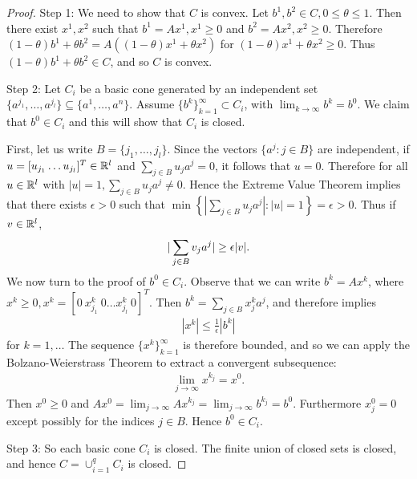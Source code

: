 \begin{proof}
Step 1:
We need to show that $C$ is convex.
Let $b^1, b^2 \in C, 0 \le \theta \le 1$.
Then there exist $x^1, x^2$ such that $b^1 = A x^1, x^1 \ge 0$ and $b^2 = A x^2, x^2 \ge 0$.
Therefore $(1-\theta)b^1 + \theta b^2 = A \left( (1-\theta) x^1 + \theta x^2 \right)$ for $(1-\theta) x^1 + \theta x^2 \ge 0$.
Thus $(1-\theta)b^1 + \theta b^2 \in C$, and so $C$ is convex.

Step 2:
Let $C_i$ be a basic cone generated by an independent set$\{ a^{j_1}, \dots, a^{j_l} \} \subseteq \{ a^1, \dots, a^n \}$.
Assume $\{ b^k \}_{k=1}^{\infty} \subset C_i$, with $\lim _{k \to \infty} b^k = b^0$.
We claim that $b^0 \in C_i$ and this will show that $C_i$ is closed.

First, let us write $B = \{ j_1, \dots, j_l \}$.
Since the vectors $\{ a^j : j \in B \}$ are independent, if $u = [u_{j_1} \dots u_{j_l}]^T \in \mathbb{R}^l$ and $\sum _{j \in B} u_j a^j = 0$, it follows that $u = 0$.
Therefore for all $u \in \mathbb{R}^l$ with $|u| = 1, \sum _{j \in B} u_j a^j \neq 0$.
Hence the Extreme Value Theorem implies that there exists $\epsilon > 0$ such that $\min \left\{ |\sum _{j \in B} u_j a^j| : |u| = 1 \right\} = \epsilon > 0$.
Thus if $v \in \mathbb{R}^l$, 
\begin{align}
|\sum _{j \in B} v_j a^j| \ge \epsilon |v|. \labeq{proof_convex_closed_eq_1}
\end{align}
We now turn to the proof of $b^0 \in C_i$.
Observe that we can write $b^k = A x^k$, where $x^k \ge 0, x^k = [0 \ x_{j_1}^k \ 0 \dots x_{j_l}^k \ 0]^T$.
Then $b^k = \sum _{j \in B} x_j^k a^j$, and therefore  implies 
\begin{align}
|x^k| \le \frac{1}{\epsilon} |b^k|
\end{align}
for $k=1, \dots$
The sequence $\{ x^k \}_{k=1}^{\infty}$ is therefore bounded, and so we can apply the Bolzano-Weierstrass Theorem to extract a convergent subsequence:
\begin{align}
\lim _{j \to \infty} x^{k_j} = x^0.
\end{align}
Then $x^0 \ge 0$ and $A x^0 = \lim _{j \to \infty} A x^{k_j} = \lim _{j \to \infty} b^{k_j} = b^0$.
Furthermore $x_j^0 = 0$ except possibly for the indices $j \in B$.
Hence $b^0 \in C_i$.

Step 3:
So each basic cone $C_i$ is closed.
The finite union of closed sets is closed, and hence $C = \cup _{i=1}^{q} C_i$ is closed.
\end{proof}


